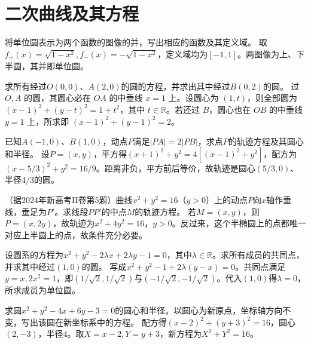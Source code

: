 \par\addvspace{12pt}

\section{二次曲线及其方程}

将单位圆表示为两个函数的图像的并，写出相应的函数及其定义域。
\solutionanswer
取\(f_+(x)=\sqrt{1-x^2},f_-(x)=-\sqrt{1-x^2}\)，定义域均为\([-1,1]\)。两图像为上、下半圆，其并即单位圆。


求所有经过\(O(0,0)\)、\(A(2,0)\)的圆的方程，并求出其中经过\(B(0,2)\)的圆。
\solutionanswer
过 \(O,A\) 的圆，其圆心必在 \(OA\) 的中垂线 \(x=1\) 上。设圆心为 \((1,t)\)，则全部圆为 \((x-1)^2+(y-t)^2=1+t^2\)，其中 \(t\in\mathbb R\)。若还过 \(B\)，圆心也在 \(OB\) 的中垂线 \(y=1\) 上，所求即 \((x-1)^2+(y-1)^2=2\)。


已知\(A(-1,0)\)、\(B(1,0)\)，动点\(P\)满足\(|PA|=2|PB|\)，求点\(P\)的轨迹方程及其圆心和半径。
\solutionanswer
设\(P=(x,y)\)，平方得\((x+1)^2+y^2=4[(x-1)^2+y^2]\)，配方为\((x-5/3)^2+y^2=16/9\)。距离非负，平方前后等价，故轨迹是圆心\((5/3,0)\)、半径\(4/3\)的圆。


（据2024年新高考II卷第5题）曲线\(x^{2} + y^{2} = 16\)（\(y > 0\)）上的动点\(P\)向\(x\)轴作垂线，垂足为\(P'\)。求线段\(PP'\)的中点\(M\)的轨迹方程。
\solutionanswer
若\(M=(x,y)\)，则\(P=(x,2y)\)，故轨迹为\(x^2+4y^2=16\)，\(y>0\)。反过来，这个半椭圆上的点都唯一对应上半圆上的点，故条件充分必要。


设圆系的方程为\(x^{2} + y^{2} - 2\lambda x + 2\lambda y - 1 = 0\)，其中\(\lambda \in \mathbb{R}\)。求所有成员的共同点，并求其中经过\((1,0)\)的圆。
\solutionanswer
写成\(x^2+y^2-1+2\lambda(y-x)=0\)。共同点满足\(y=x,2x^2=1\)，即\((1/\sqrt2,1/\sqrt2)\)与\((-1/\sqrt2,-1/\sqrt2)\)。代入\((1,0)\)得\(\lambda=0\)，所求成员为单位圆。


求圆\(x^{2}+y^{2}-4x+6y-3=0\)的圆心和半径。以圆心为新原点，坐标轴方向不变，写出该圆在新坐标系中的方程。
\solutionanswer
配方得\((x-2)^2+(y+3)^2=16\)，圆心\((2,-3)\)，半径\(4\)。取\(X=x-2,Y=y+3\)，新方程为\(X^2+Y^2=16\)。


